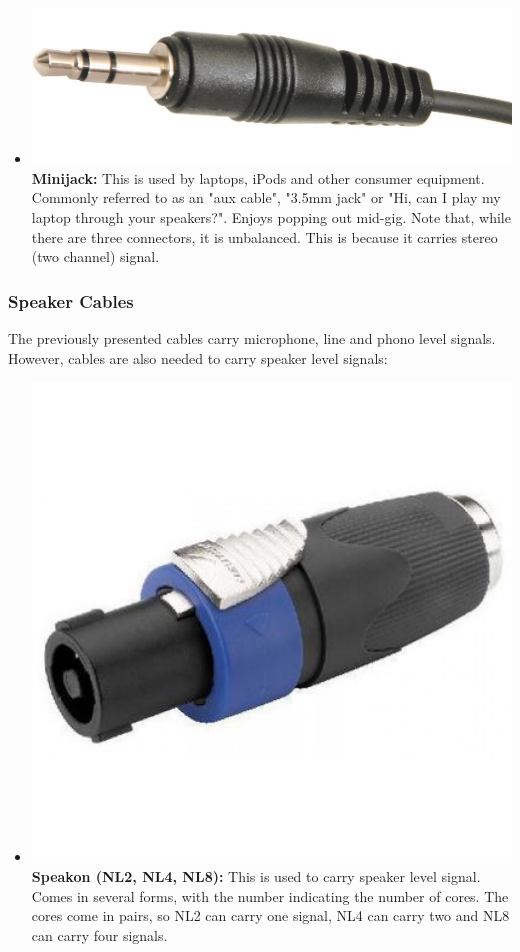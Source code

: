 \documentclass[14pt]{article} %
\begin{document}
\begin{itemize}
\item \includegraphics[scale=0.2]{minijack2.jpg}\textbf{Minijack:} This is used by laptops, iPods and other consumer equipment. Commonly referred to as an "aux cable", "3.5mm jack" or "Hi, can I play my laptop through your speakers?". Enjoys popping out mid-gig. Note that, while there are three connectors, it is unbalanced. This is because it carries stereo (two channel) signal. 

\end{itemize}

\subsubsection{Speaker Cables}
\label{speaker-cables} 
The previously presented cables carry microphone, line and phono level signals. However, cables are also needed to carry speaker level signals:

\begin{itemize}

\item \includegraphics[scale=0.16]{nl2.jpg}\textbf{Speakon (NL2, NL4, NL8):} This is used to carry speaker level signal. Comes in several forms, with the number indicating the number of cores. The cores come in pairs, so NL2 can carry one signal, NL4 can carry two and NL8 can carry four signals.

\end{itemize}
\end{document}

